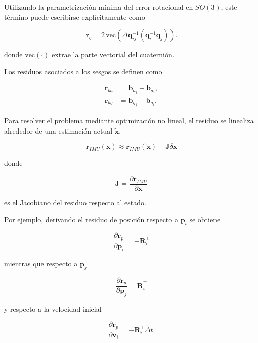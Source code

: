 Utilizando la parametrización mínima del error rotacional en $SO(3)$, este término puede escribirse explícitamente como

\begin{equation}
\mathbf{r}_q =
2\,\mathrm{vec}
\left(
\Delta \mathbf{q}_{ij}^{-1}
(\mathbf{q}_i^{-1}\mathbf{q}_j)
\right).
\end{equation}

\noindent donde $\mathrm{vec}(\cdot)$ extrae la parte vectorial del cuaternión.

Los residuos asociados a los sesgos se definen como

\begin{align}
\mathbf{r}_{ba} &= \mathbf{b}_{a_j} - \mathbf{b}_{a_i}, \\
\mathbf{r}_{bg} &= \mathbf{b}_{g_j} - \mathbf{b}_{g_i}.
\end{align}

Para resolver el problema mediante optimización no lineal, el residuo se linealiza alrededor de una estimación actual $\tilde{\mathbf{x}}$.

\begin{equation}
\mathbf{r}_{IMU}(\mathbf{x})
\approx
\mathbf{r}_{IMU}(\tilde{\mathbf{x}})
+
\mathbf{J}
\delta \mathbf{x}
\end{equation}

\noindent donde

\begin{equation}
\mathbf{J}
=
\frac{\partial \mathbf{r}_{IMU}}{\partial \mathbf{x}}
\end{equation}

\noindent es el Jacobiano del residuo respecto al estado.

Por ejemplo, derivando el residuo de posición respecto a $\mathbf{p}_i$ se obtiene

\begin{equation}
\frac{\partial \mathbf{r}_p}{\partial \mathbf{p}_i}
=
-\mathbf{R}_i^\top
\end{equation}

\noindent mientras que respecto a $\mathbf{p}_j$

\begin{equation}
\frac{\partial \mathbf{r}_p}{\partial \mathbf{p}_j}
=
\mathbf{R}_i^\top
\end{equation}

\noindent y respecto a la velocidad inicial

\begin{equation}
\frac{\partial \mathbf{r}_p}{\partial \mathbf{v}_i}
=
-\mathbf{R}_i^\top \Delta t.
\end{equation}

